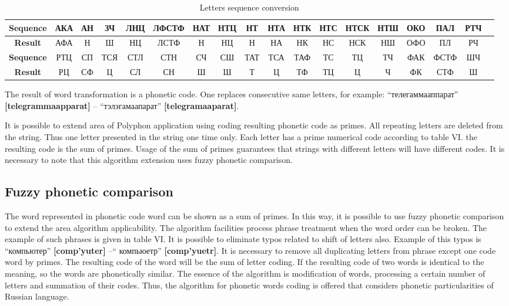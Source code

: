 \documentclass[conference,a4paper]{IEEEtran}
\begin{document}
\begin{table*}
	\caption{Letters sequence conversion}
    \label{lbl-seqconv}
    \centering
    \begin{tabular}{|c*{17}{|c}|}
    \hline
    \textbf{Sequence} &	АКА & АН &	ЗЧ &	ЛНЦ &	ЛФСТФ &	НАТ &	НТЦ &	НТ & НТА &	НТК &	НТС &	НТСК &	НТШ &	ОКО &	ПАЛ &	РТЧ \\
    \hline
	\textbf{Result} &	АФА &	Н &	Ш &	НЦ &	ЛСТФ &	Н &	НЦ & Н & НА &	НК  &	НС &	НСК &	НШ &	ОФО &	ПЛ &	РЧ \\
    \hline
	\addlinespace
    \hline
    \textbf{Sequence} &	РТЦ &	СП &	ТСЯ &	СТЛ &	СТН &	СЧ &	СШ &	ТАТ & ТСА &	ТАФ &	ТС &	ТЦ &	ТЧ &	ФАК &	ФСТФ &	ШЧ \\
    \hline
	\textbf{Result} &	РЦ &	СФ &	Ц &	СЛ &	СН &	Ш &	Ш &	Т & Ц &	ТФ &	ТЦ &	Ц &	Ч &	ФК &	СТФ &	Ш \\
    \hline
    \end{tabular}
\end{table*}

The result of word transformation is a phonetic code. One replaces consecutive same letters, for example: “телегаммааппарат” \textbf{[telegrammaapparat]} – “тэлэгамаапарат” \textbf{[telegramaaparat]}.

It is possible to extend area of Polyphon application using coding resulting phonetic code as primes. All repeating letters are deleted from the string. Thus one letter presented in the string one time only. Each letter has a prime numerical code according to table VI. the resulting code is the sum of primes. Usage of the sum of primes guarantees that strings with different letters will have different codes. It is necessary to note that this algorithm extension uses fuzzy phonetic comparison. 

\subsection{Fuzzy phonetic comparison}

The word represented in phonetic code word can be shown as a sum of primes. In this way, it is possible to use fuzzy phonetic comparison to extend the area algorithm applicability. The algorithm facilities process phrase treatment when the word order can be broken. The example of such phrases is given in table VI. It is possible to eliminate typos related to shift of letters also. Example of this typos is “компьютер” \textbf{[comp’yuter]} –“ компьюетр” \textbf{[comp’yuetr]}.
It is necessary to remove all duplicating letters from phrase except one code word by primes. The resulting code of the word will be the sum of letter coding. If the resulting code of two words is identical to the meaning, so the words are phonetically similar.
The essence of the algorithm is modification of words, processing a certain number of letters and summation of their codes.
Thus, the algorithm for phonetic words coding is offered that considers phonetic particularities of Russian language. 
\end{document}
